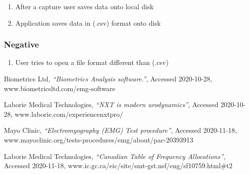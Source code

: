 \documentclass[12pt,a4paper]{article}
\begin{document}
\begin{enumerate}
	\item After a capture user saves data onto local disk
	\item Application saves data in (.csv) format onto disk
\end{enumerate}

\subsubsection{Negative}

\begin{enumerate}
	\item User tries to open a file format different than (.csv)  
\end{enumerate}

\newpage
\begin{thebibliography}{9}

  Biometrics Ltd,
  \textit{“Biometrics Analysis software.”},
  Accessed 2020-10-28,
  www.biometricsltd.com/emg-software
  
  Laborie Medical Technologies,
  \textit{“NXT is modern urodynamics”},
  Accessed 2020-10-28,
  www.laborie.com/experiencenxtpro/

  Mayo Clinic,
  \textit{“Electromyography (EMG) Test procedure”},
  Accessed 2020-11-18,
  www.mayoclinic.org/tests-procedures/emg/about/pac-20393913

  Laborie Medical Technologies,
  \textit{“Canadian Table of Frequency Allocations”},
  Accessed 2020-11-18,
  www.ic.gc.ca/eic/site/smt-gst.nsf/eng/sf10759.html#t2
 
\end{thebibliography}
\end{document}
